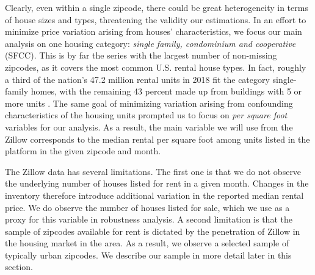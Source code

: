 Clearly, even within a single zipcode, there could be great heterogeneity in terms of 
house sizes and types, threatening the validity our estimations. In an effort to 
minimize price variation arising from houses' characteristics, we focus our main 
analysis on one housing category: \textit{single family, condominium and cooperative} 
(SFCC). This is by far the series with the largest number of non-missing zipcodes, as 
it covers the most common U.S. rental house types. In fact, roughly a third of the 
nation's 47.2 million rental units in 2018 fit the category single-family homes, with 
the remaining 43 percent made up from buildings with 5 or more units 
\parencite{JCHS2020}. The same goal of minimizing variation arising from confounding
characteristics of the housing units prompted us to focus on \textit{per square foot} 
variables for our analysis. As a result, the main variable we will use from the Zillow
corresponds to the median rental per square foot among units listed in the platform
in the given zipcode and month.

The Zillow data has several limitations. The first one is that we do not observe the 
underlying number of houses listed for rent in a given month. Changes in the inventory 
therefore introduce additional variation in the reported median rental price. We do 
observe the number of houses listed for sale, which we use as a proxy for this variable 
in robustness analysis. A second limitation is that the sample of zipcodes available for 
rent is dictated by the penetration of Zillow in the housing market in the area. As a
result, we observe a selected sample of typically urban zipcodes. We describe our sample 
in more detail later in this section.

